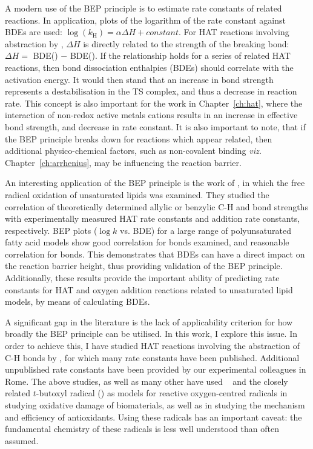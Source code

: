 A modern use of the BEP principle is to estimate rate constants of related reactions. In application, plots of the logarithm of the rate constant against BDEs are used: $\log(k_\mathrm{H}) = \alpha \Delta H + constant$. For HAT reactions involving abstraction by \cumo, $\Delta H$ is directly related to the strength of the breaking bond: $\Delta H =$ BDE() $-$ BDE(). If the relationship holds for a series of related HAT reactions, then bond dissociation enthalpies (BDEs) should correlate with the activation energy. It would then stand that an increase in bond strength represents a destabilisation in the TS complex, and thus a decrease in reaction rate. This concept is also important for the work in Chapter~\ref{ch:hat}, where the interaction of non-redox active metals cations results in an increase in effective bond strength, and decrease in rate constant. It is also important to note, that if the BEP principle breaks down for reactions which appear related, then additional physico-chemical factors, such as non-covalent binding \emph{viz.} Chapter~\ref{ch:arrhenius}, may be influencing the reaction barrier.

An interesting application of the BEP principle is the work of \citet{Pratt2003}, in which the free radical oxidation of unsaturated lipids was examined. They studied the correlation of theoretically determined allylic or benzylic C-H and  bond strengths with experimentally measured HAT rate constants and  addition rate constants, respectively. BEP plots ($\log k$ vs. BDE) for a large range of polyunsaturated fatty acid models show good correlation for  bonds examined, and reasonable correlation for  bonds. This demonstrates that BDEs can have a direct impact on the reaction barrier height, thus providing validation of the BEP principle. Additionally, these results provide the important ability of predicting rate constants for HAT and oxygen addition reactions related to unsaturated lipid models, by means of calculating BDEs.

A significant gap in the literature is the lack of applicability criterion for how broadly the BEP principle can be utilised. In this work, I explore this issue. In order to achieve this, I have studied HAT reactions involving the abstraction of C-H bonds by \cumo, for which many rate constants have been published.\cite{Bietti2010, Bietti2011, Pischel2001, Salamone2011, Salamone2012, Salamone2012a, Salamone2013, Salamone2015} Additional unpublished rate constants have been provided by our experimental colleagues in Rome. The above studies, as well as many other have used \cumo~ and the closely related $t$-butoxyl radical () as models for reactive oxygen-centred radicals in studying oxidative damage of biomaterials,\cite{Adam1998, Adam2002, Jones2003} as well as in studying the mechanism and efficiency of antioxidants.\cite{MacFaul1996, Valgimigli1996, Valgimigli1999, Jovanovic1999, Sortino2003} Using these radicals has an important caveat: the fundamental chemistry of these radicals is less well understood than often assumed. \cite{Tanko2001, Finn2004, Salamone2011b}


